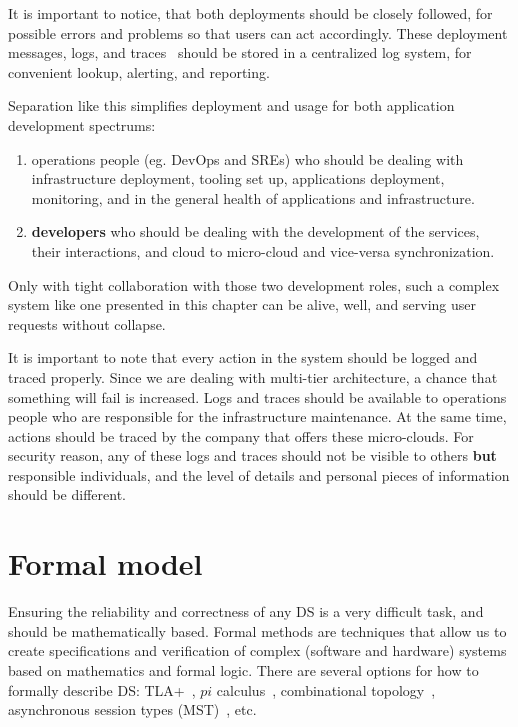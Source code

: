 It is important to notice, that both deployments should be closely followed, for possible errors and problems so that users can act accordingly. These deployment messages, logs, and traces~\cite{36356} should be stored in a centralized log system, for convenient lookup, alerting, and reporting.

Separation like this simplifies deployment and usage for both application development spectrums: 

\begin{enumerate}[start=1,label={(\bfseries \roman*)}]
	\item operations people (eg. DevOps and SREs) who should be dealing with infrastructure deployment, tooling set up, applications deployment, monitoring, and in the general health of applications and infrastructure.
	\item \textbf{developers} who should be dealing with the development of the services, their interactions, and cloud to micro-cloud and vice-versa synchronization.
\end{enumerate}

\noindent
Only with tight collaboration with those two development roles, such a complex system like one presented in this chapter can be alive, well, and serving user requests without collapse.

It is important to note that every action in the system should be logged and traced properly. Since we are dealing with multi-tier architecture, a chance that something will fail is increased. Logs and traces should be available to operations people who are responsible for the infrastructure maintenance. At the same time, actions should be traced by the company that offers these micro-clouds. For security reason, any of these logs and traces should not be visible to others \textbf{but} responsible individuals, and the level of details and personal pieces of information should be different.
%
%
\section{Formal model}\label{sec:formal_model}
%
Ensuring the reliability and correctness of any DS is a very difficult task, and should be mathematically based. Formal methods are techniques that allow us to create specifications and verification of complex (software and hardware) systems based on mathematics and formal logic. There are several options for how to formally describe DS: TLA+~\cite{YuML99}, $pi$ calculus~\cite{0018113}, combinational topology~\cite{Upadhyay16}, asynchronous session types (MST)~\cite{HondaYC08}, etc. 

